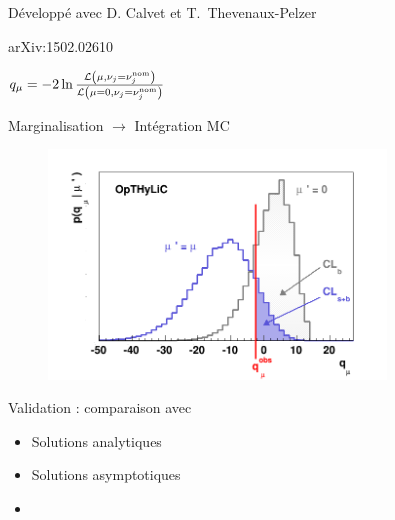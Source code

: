 \begin{frame}
\frametitle{\OTH}

\vspace*{-1cm}
\begin{columns}

\begin{column}{0.5\textwidth}
\vspace*{0.8cm}
\begin{block}{}
\begin{maliste}
\item Développé avec D. Calvet et T.~Thevenaux-Pelzer
\item arXiv:1502.02610
\item \begin{footnotesize}$q_\mu=-2\ln\frac{{\cal L}\left(\mu,\nu_j=\nu_j^\text{nom}\right)}{{\cal L}\left(\mu=0,\nu_j=\nu_j^\text{nom}\right)}$\end{footnotesize}
\item Marginalisation $\rightarrow$ Intégration MC
\end{maliste}
\vspace*{-0.3cm}
\begin{figure}[!htb]
\begin{center}
\includegraphics[width=0.8\textwidth]{Figures/Stat/testStatDistribExample.png}
\end{center}
\end{figure}
\begin{maliste}
\vspace*{-0.3cm}
\item Validation : comparaison avec
\begin{itemize}
\item Solutions analytiques
\item Solutions asymptotiques
\item \mclimit
\end{itemize}
\end{maliste}
\end{block}
\end{column}


\end{columns}
\end{frame}
